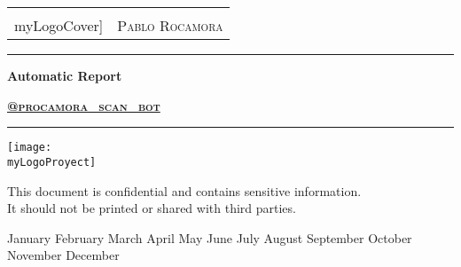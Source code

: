 \documentclass[a4paper]{article}
\makeatletter
\newcommand{\myLogoCover}{personal.png}
\newcommand{\myLogoProyect}{logo_transparent.png}
\newcommand{\myTitle}{Automatic Report}
\newcommand{\mySubtitle}{\href{https://telegram.me/procamora_scan_bot}{@procamora\_scan\_bot}}
\newcommand{\myName}{Pablo Rocamora}
\newcommand{\myMonth}{%
  \ifcase\month   %
    \or January   %
    \or February  %
    \or March     %
    \or April     %
    \or May       %
    \or June      %
    \or July      %
    \or August    %
    \or September %
    \or October   %
    \or November  %
    \or December  %
  \fi}
\newcommand{\myDate}{\number\day\space \myMonth \number\year}
\makeatother
\begin{document}
\cfoot{\thepage}
\begin{titlepage}
	\centering
    
    \begin{tabular}{ll}
    \raisebox{-.4\height}{\texttt{[image: \\myLogoCover]}} & { \hspace{8cm} \scshape\LARGE {\myName}} \\
	\end{tabular}
    
    \par\vspace{1cm}
	\vfill
    
    {\rule{\linewidth}{0.5mm}\vspace{0.5cm}} %
    
    {\Huge\bfseries\textcolor{greenPortada}{\myTitle}}
	\par\vspace{0.5cm}
	{\scshape\LARGE \textbf{\mySubtitle}}

    {\vspace{0.5cm}\rule{\linewidth}{0.5mm}} %
    
	\vfill\vfill
	\texttt{[image: \\myLogoProyect]}\par\vspace{1cm}
	\vfill\vfill
    
	\begin{tcolorbox}[colback=red!5!white,colframe=red!75!black]
		\centering
		This document is confidential and contains sensitive information.
		\\
		It should not be printed or shared with third parties.
	\end{tcolorbox}
    
	\vfill\vfill
	{\large \myDate \par}
	\vfill
\end{titlepage}

	



\clearpage
\tableofcontents	     %
\clearpage
\end{document}
